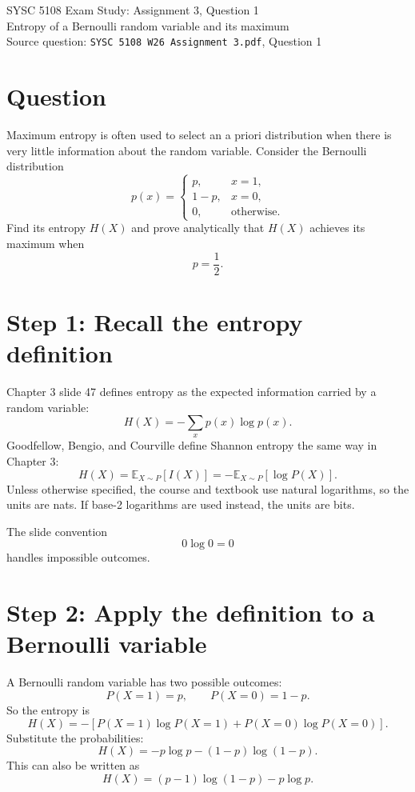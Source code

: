 \documentclass[11pt]{article}
\begin{document}
\begin{center}
{\Large SYSC 5108 Exam Study: Assignment 3, Question 1}\\
\vspace{0.3em}
{\large Entropy of a Bernoulli random variable and its maximum}\\
\vspace{0.3em}
Source question: \texttt{SYSC 5108 W26 Assignment 3.pdf}, Question 1
\end{center}

\section*{Question}

Maximum entropy is often used to select an a priori distribution when there is very little information about the random variable. Consider the Bernoulli distribution
\[
p(x)=
\begin{cases}
p, & x=1,\\
1-p, & x=0,\\
0, & \text{otherwise}.
\end{cases}
\]
Find its entropy $H(X)$ and prove analytically that $H(X)$ achieves its maximum when
\[
p=\frac{1}{2}.
\]

\section*{Step 1: Recall the entropy definition}

Chapter 3 slide 47 defines entropy as the expected information carried by a random variable:
\[
H(X)=-\sum_x p(x)\log p(x).
\]
Goodfellow, Bengio, and Courville define Shannon entropy the same way in Chapter 3:
\[
H(X)=\mathbb{E}_{X\sim P}[I(X)]
=-\mathbb{E}_{X\sim P}[\log P(X)].
\]
Unless otherwise specified, the course and textbook use natural logarithms, so the units are nats. If base-2 logarithms are used instead, the units are bits.

The slide convention
\[
0\log 0=0
\]
handles impossible outcomes.

\section*{Step 2: Apply the definition to a Bernoulli variable}

A Bernoulli random variable has two possible outcomes:
\[
P(X=1)=p,\qquad P(X=0)=1-p.
\]
So the entropy is
\[
H(X)
=-\left[P(X=1)\log P(X=1)+P(X=0)\log P(X=0)\right].
\]
Substitute the probabilities:
\[
\boxed{
H(X)=-p\log p-(1-p)\log(1-p)
}.
\]
This can also be written as
\[
H(X)=(p-1)\log(1-p)-p\log p.
\]
\end{document}
